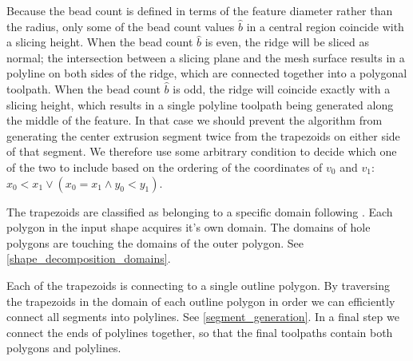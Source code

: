 Because the bead count is defined in terms of the feature diameter rather than the radius, only some of the bead count values $\hat{b}$ in a central region coincide with a slicing height.
When the bead count $\hat{b}$ is even, the ridge will be sliced as normal;
the intersection between a slicing plane and the mesh surface results in a polyline on both sides of the ridge, which are connected together into a polygonal toolpath.
When the bead count $\hat{b}$ is odd, the ridge will coincide exactly with a slicing height, which results in a single polyline toolpath being generated along the middle of the feature.
In that case we should prevent the algorithm from generating the center extrusion segment twice from the trapezoids on either side of that segment.
We therefore use some arbitrary condition to decide which one of the two to include based on the ordering of the coordinates of $v_0$ and $v_1$: $x_0 < x_1 \lor (x_0 = x_1 \land y_0 < y_1)$.

The trapezoids are classified as belonging to a specific domain following \citeauthor{Ding2016a}.
Each polygon in the input shape acquires it's own domain.
The domains of hole polygons are touching the domains of the outer polygon.
See \cref{shape_decomposition_domains}.

Each of the trapezoids is connecting to a single outline polygon.
By traversing the trapezoids in the domain of each outline polygon in order we can efficiently connect all segments into polylines.
See \cref{segment_generation}.
In a final step we connect the ends of polylines together, so that the final toolpaths contain both polygons and polylines.

